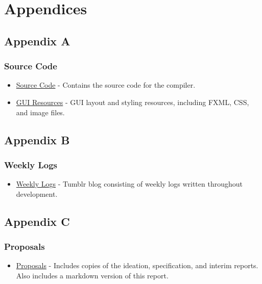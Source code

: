 \documentclass[
]{report}
\providecommand{\tightlist}{%
  \setlength{\itemsep}{0pt}\setlength{\parskip}{0pt}}
\begin{document}
\chapter{Appendices}

\section{Appendix A}
\subsection{Source Code}
\begin{itemize}
\tightlist
\item
  \href{https://github.com/louislefevre/onyx-compiler/tree/master/src/main/java}{Source
  Code} - Contains the source code for the compiler.
\item
  \href{https://github.com/louislefevre/onyx-compiler/tree/master/src/main/resources}{GUI
  Resources} - GUI layout and styling resources, including FXML, CSS,
  and image files.
\end{itemize}

\section{Appendix B}
\subsection{Weekly Logs}
\begin{itemize}
\tightlist
\item
  \href{https://llefe001.tumblr.com/}{Weekly Logs} - Tumblr blog
  consisting of weekly logs written throughout development.
\end{itemize}

\section{Appendix C}
\subsection{Proposals}
\begin{itemize}
\tightlist
\item
  \href{https://github.com/louislefevre/onyx-compiler/tree/master/docs}{Proposals}
  - Includes copies of the ideation, specification, and interim reports.
  Also includes a markdown version of this report.
\end{itemize}
\end{document}
